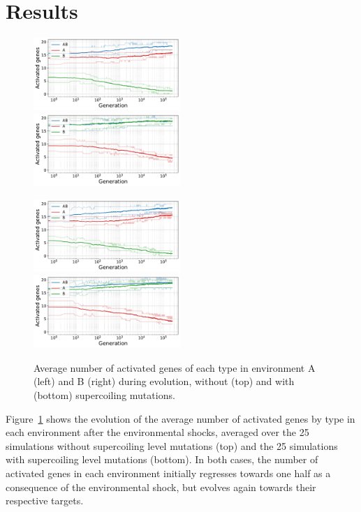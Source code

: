 \section{Results}

\begin{figure}[H]
\centering
\includegraphics[width=0.495\textwidth]{epistasis/img/control/gene_activity_env_A.pdf}
\includegraphics[width=0.495\textwidth]{epistasis/img/control/gene_activity_env_B.pdf}

\includegraphics[width=0.495\textwidth]{epistasis/img/with-sc/gene_activity_env_A.pdf}
\includegraphics[width=0.495\textwidth]{epistasis/img/with-sc/gene_activity_env_B.pdf}
\caption[Evolution of the number of activated genes in each environment, with a]{Average number of activated genes of each type in environment A (left) and B (right) during evolution, without (top) and with (bottom) supercoiling mutations.}
\label{fig:epistasis:activ-by-env}
\end{figure}

Figure~\ref{fig:epistasis:activ-by-env} shows the evolution of the average number of activated genes by type in each environment after the environmental shocks, averaged over the 25 simulations without supercoiling level mutations (top) and the 25 simulations with supercoiling level mutations (bottom).
In both cases, the number of activated genes in each environment initially regresses towards one half as a consequence of the environmental shock, but evolves again towards their respective targets.

